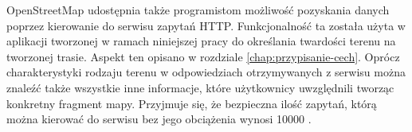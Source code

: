 OpenStreetMap udostępnia także programistom możliwość pozyskania danych poprzez kierowanie do serwisu zapytań HTTP. Funkcjonalność ta została użyta w aplikacji tworzonej w ramach niniejszej pracy do określania twardości terenu na tworzonej trasie. Aspekt ten opisano w rozdziale \ref{chap:przypisanie-cech}. Oprócz charakterystyki rodzaju terenu w odpowiedziach otrzymywanych z serwisu można znaleźć także wszystkie inne informacje, które użytkownicy uwzględnili tworząc konkretny fragment mapy. Przyjmuje się, że bezpieczna ilość zapytań, którą można kierować do serwisu bez jego obciążenia wynosi 10000 \cite{overpass-wiki}.